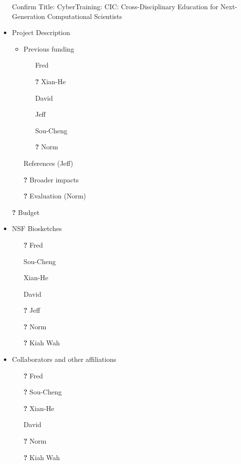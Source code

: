 \documentclass[11pt]{NSFamsart}
\newcommand{\notyet}{\textbf{?}}
\newcommand{\done}{\checkmark}
\begin{document}
\begin{itemize}
\item[\done] Confirm Title: CyberTraining: CIC:  Cross-Disciplinary Education for Next-Generation Computational Scientists
\item Project Description
\begin{itemize}
\item Previous funding
\begin{itemize}
\item[\done] Fred
\item[\notyet] Xian-He
\item[\done] David
\item[\done] Jeff
\item[\done] Sou-Cheng
\item[\notyet] Norm
\end{itemize}
\item[\done] References (Jeff)
\item[\notyet] Broader impacts
\item[\notyet] Evaluation (Norm)
\end{itemize}

\item[\notyet] Budget

\item NSF Biosketches
\begin{itemize}
\item[\notyet] Fred
\item[\done] Sou-Cheng
\item[\done] Xian-He
\item[\done] David
\item[\notyet] Jeff
\item[\notyet] Norm
\item[\notyet] Kiah Wah
\end{itemize}


\item Collaborators and other affiliations
\begin{itemize}
\item[\notyet] Fred
\item[\notyet] Sou-Cheng 
\item[\notyet] Xian-He
\item[\done] David
\item[\notyet] Norm
\item[\notyet] Kiah Wah
\end{itemize}


\end{itemize}
\end{document}
